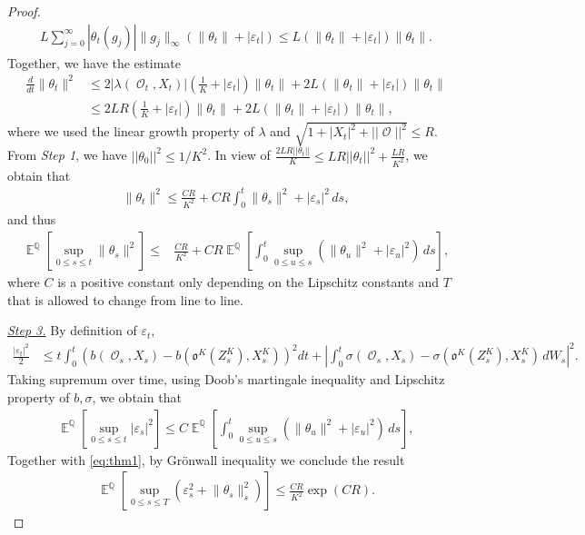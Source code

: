 \documentclass[11pt]{article}
\numberwithin{equation}{section}
\theoremstyle{plain}
\theoremstyle{definition}
\DeclareMathOperator{\E}{\mathbb{E}}
\DeclareMathOperator{\Q}{\mathbb{Q}}
\DeclareMathOperator{\calO}{\mathcal{O}}
\def\mo{\mathfrak{o}}
\begin{document}
\begin{proof}
\begin{align*}
      L \sum_{j=0}^{\infty} |\theta_t(g_j)| \lVert g_j \rVert_{\infty}(\lVert \theta_t \rVert +|\varepsilon_t|) \leq L(\lVert \theta_t \rVert + |\varepsilon_t|) \lVert \theta_t \rVert.
\end{align*}
Together, we have the estimate 
\begin{align*}
    \frac{d}{dt}\lVert \theta_t \rVert^2 &\leq  2 | \lambda(\calO_t, X_t)| \left(\frac{1}{K}+|\varepsilon_t| \right) \lVert \theta_t \rVert + 2L(\lVert \theta_t \rVert +|\varepsilon_t|) \lVert \theta_t \rVert \\
    &\leq 2 LR \left(\frac{1}{K}+|\varepsilon_t| \right) \lVert \theta_t \rVert + 2L(\lVert \theta_t \rVert +|\varepsilon_t|) \lVert \theta_t \rVert,
\end{align*}
where we used the linear growth property of $\lambda$ and $\sqrt{1+|X_t|^2+||\calO||^2} \leq R$. From \textit{Step 1}, we have $||\theta_0||^2 \leq 1/K^2$. In view of   $\frac{2LR ||\theta_t||}{K}\leq LR||\theta_t||^2+\frac{LR}{K^2}$, we obtain that
\begin{align*}
 \lVert \theta_t \rVert^2  
  \leq  \frac{CR}{K^2} +CR  \int_0^t \lVert \theta_s \rVert^2+|\varepsilon_s|^2\, ds,
\end{align*}
and thus
\begin{align}\label{eq:thm1}
  \E^{\Q} \left[  \sup_{0 \leq s \leq t}\lVert \theta_s \rVert^2 \right] 
  \leq & \frac{CR}{K^2} +  CR\E^{\Q} \left[ \int_0^t  \sup_{0 \leq u \leq s} (\lVert \theta_u \rVert^2+ |\varepsilon_u|^2 )\, ds \right],
\end{align}
where $C$ is a positive constant only depending on the Lipschitz constants and $T$ that is allowed to change from line to line.


\bigskip

\noindent \underline{\textit{Step 3.}}  By definition of $\varepsilon_t$,
\begin{align*}
\frac{|\varepsilon_t|^2}{2} &\leq  t \int_0^t   \left(b(\calO_s,X_s)-b(\mo^K(Z^K_s), X^K_s)\right)^2dt   +   \left| \int_0^t \sigma(\calO_s,X_s)-\sigma(\mo^K(Z^K_s),X^K_s) \, dW_s \right|^2.
\end{align*}
Taking supremum over time, using Doob's martingale inequality and Lipschitz property of $b,\sigma$, we obtain that 
\begin{align*}
    \E^{\Q} \left[\sup_{0\leq s  \leq t} |\varepsilon_s |^2 \right] \leq C  \E^{\Q} \left[ \int_0^t  \sup_{0 \leq u \leq s} (\lVert \theta_u \rVert^2+ |\varepsilon_u|^2 )\, ds \right],
\end{align*}
Together with \eqref{eq:thm1}, by Gr\"{o}nwall inequality we conclude the result
\begin{align}\label{eq:convergencerate}
    \E^{\Q}\left[ \sup_{0 \leq s \leq T } (\varepsilon_s^2+ \lVert \theta_s \rVert_s^2 )\right] \leq \frac{CR}{K^2} \exp(CR). 
\end{align}
\end{proof}
%
\end{document}
